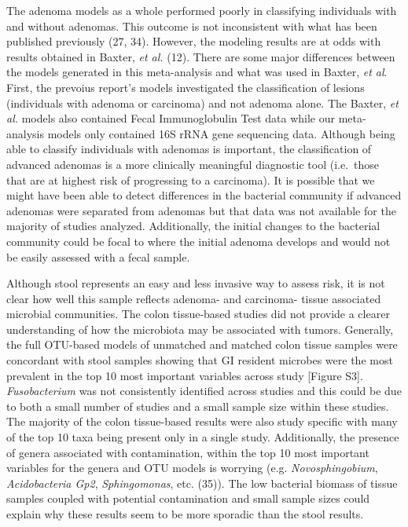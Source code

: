 \documentclass[12pt,]{article}
\begin{document}
The adenoma models as a whole performed poorly in classifying
individuals with and without adenomas. This outcome is not inconsistent
with what has been published previously (27, 34). However, the modeling
results are at odds with results obtained in Baxter, \emph{et al.} (12).
There are some major differences between the models generated in this
meta-analysis and what was used in Baxter, \emph{et al}. First, the
prevoius report's models investigated the classification of lesions
(individuals with adenoma or carcinoma) and not adenoma alone. The
Baxter, \emph{et al.} models also contained Fecal Immunoglobulin Test
data while our meta-analysis models only contained 16S rRNA gene
sequencing data. Although being able to classify individuals with
adenomas is important, the classification of advanced adenomas is a more
clinically meaningful diagnostic tool (i.e.~those that are at highest
risk of progressing to a carcinoma). It is possible that we might have
been able to detect differences in the bacterial community if advanced
adenomas were separated from adenomas but that data was not available
for the majority of studies analyzed. Additionally, the initial changes
to the bacterial community could be focal to where the initial adenoma
develops and would not be easily assessed with a fecal sample.

Although stool represents an easy and less invasive way to assess risk,
it is not clear how well this sample reflects adenoma- and carcinoma-
tissue associated microbial communities. The colon tissue-based studies
did not provide a clearer understanding of how the microbiota may be
associated with tumors. Generally, the full OTU-based models of
unmatched and matched colon tissue samples were concordant with stool
samples showing that GI resident microbes were the most prevalent in the
top 10 most important variables across study {[}Figure S3{]}.
\emph{Fusobacterium} was not consistently identified across studies and
this could be due to both a small number of studies and a small sample
size within these studies. The majority of the colon tissue-based
results were also study specific with many of the top 10 taxa being
present only in a single study. Additionally, the presence of genera
associated with contamination, within the top 10 most important
variables for the genera and OTU models is worrying (e.g.
\emph{Novosphingobium}, \emph{Acidobacteria Gp2}, \emph{Sphingomonas},
etc. (35)). The low bacterial biomass of tissue samples coupled with
potential contamination and small sample sizes could explain why these
results seem to be more sporadic than the stool results.
\end{document}
